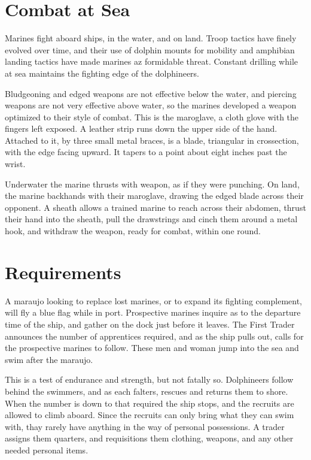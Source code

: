 \section{Combat at Sea}

Marines fight aboard ships, in the water, and on land. Troop tactics have finely evolved over time, and their use of dolphin mounts for mobility and amphibian landing tactics have made marines az formidable threat. Constant drilling while at sea maintains the fighting edge of the dolphineers.

Bludgeoning and edged weapons are not effective below the water, and piercing weapons are not very effective above water, so the marines developed a weapon optimized to their style of combat. This is the maroglave, a cloth glove with the fingers left exposed. A leather strip runs down the
upper side of the hand. Attached to it, by three small metal braces, is a blade, triangular in crossection, with the edge
facing upward. It tapers to a point about eight inches past the wrist.

Underwater the marine thrusts with weapon, as if they were punching. On land, the marine backhands with their maroglave, drawing the edged blade across their opponent. A sheath allows a trained marine to reach across their abdomen, thrust their hand into the sheath, pull the drawstrings and cinch them around a metal hook, and withdraw the weapon, ready for combat, within one round.

\section{Requirements}

A maraujo looking to replace lost marines, or to expand its fighting complement, will fly a blue flag while in
port. Prospective marines inquire as to the departure time of the ship, and gather on the dock just before it leaves. The First Trader announces the number of apprentices required, and as the ship pulls out, calls for the prospective marines to follow. These men and woman jump into the sea and swim
after the maraujo.

This is a test of endurance and strength, but not fatally so. Dolphineers follow behind the swimmers, and as each falters, rescues  and returns them to shore. When the number is down to that required the ship stops, and the recruits are allowed to climb aboard. Since the recruits can only bring what they can swim with, thay rarely have anything in the way of personal possessions. A trader assigns them quarters, and requisitions them clothing, weapons, and any other needed personal items.

